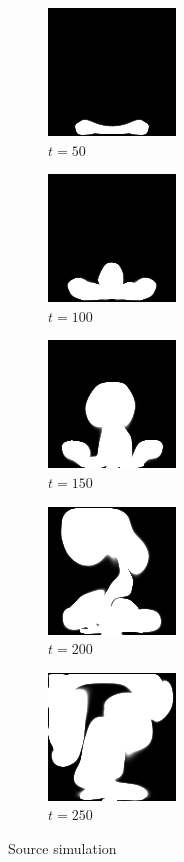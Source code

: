 \documentclass[a4paper,12pt,twoside]{report}
\begin{document}
\begin{figure}
\centering
\begin{subfigure}{0.18\textwidth}
  \centering
  \includegraphics[scale=0.56]{buoyancy_test/dens_000050_src.png}
  \caption{$t=50$}
\end{subfigure}
\begin{subfigure}{0.18\textwidth}
  \centering
  \includegraphics[scale=0.56]{buoyancy_test/dens_000100_src.png}
  \caption{$t=100$}
\end{subfigure}
\begin{subfigure}{0.18\textwidth}
  \centering
  \includegraphics[scale=0.56]{buoyancy_test/dens_000150_src.png}
  \caption{$t=150$}
\end{subfigure}
\begin{subfigure}{0.18\textwidth}
  \centering
  \includegraphics[scale=0.56]{buoyancy_test/dens_000200_src.png}
  \caption{$t=200$}
\end{subfigure}
\begin{subfigure}{0.18\textwidth}
  \centering
  \includegraphics[scale=0.56]{buoyancy_test/dens_000249_src.png}
  \caption{$t=250$}
\end{subfigure}
\caption{Source simulation}
\label{sol buoyancy high source}
\end{figure}
\end{document}
